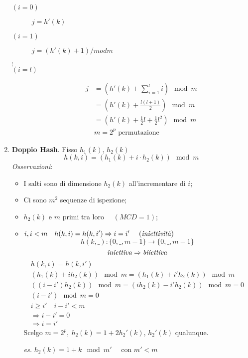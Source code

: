 \begin{enumerate}
    \begin{description}
        \item[$(i=0) \quad$] $j = h'(k)$
        \item[$(i=1) \quad$] $j = (h'(k)+1) /mod m$
        \item[$\vdots$] 
        \item[$(i=l) \quad$] 
        \begin{align*}
            j & = \left( h'(k) + \displaystyle\sum_{i=1}^{l}i \right) \mod m \\
            & = \left( h'(k) + \frac{l(l+1)}{2} \right) \mod m \\
            & = \left( h'(k) + \frac{1}{2}l + \frac{1}{2}l^2 \right) \mod m \\
            & m = 2^p \text{ permutazione}
        \end{align*}
    \end{description}
    \item \textbf{Doppio Hash}. Fisso $h_1(k)$, $h_2(k)$
    $$h(k,i) = (h_1(k) + i \cdot h_2(k)) \mod m$$
    \emph{Osservazioni}:
    \begin{itemize}
        \item I salti sono di dimensione $h_2(k)$ all'incrementare di $i$; 
        \item Ci sono $m^2$ sequenze di ispezione;
        \item $h_2(k)$ e $m$ primi tra loro $ \quad (MCD = 1)$;
        \item $i, i<m \quad h(k,i) = h(k,i') \Rightarrow i = i' \ \quad (\text{\emph{iniettività}})$
        $$h(k, \_) : \{ 0, \_, m-1 \} \rightarrow \{ 0,\_, m-1 \}$$
        $$\text{\emph{iniettiva}} \Rightarrow \text{\emph{biiettiva}}$$
        \begin{gather*}
            h(k,i) = h(k,i') \\
            (h_1(k) + ih_2(k)) \mod m = (h_1(k) + i'h_2(k)) \mod m \\
            ((i - i')h_2(k)) \mod m = (i h_2(k) - i'h_2(k)) \mod m = 0 \\
            (i - i') \mod m = 0 \\
            i \geq i' \quad i - i' < m \\ 
            \Rightarrow i - i' = 0 \\
            \Rightarrow i = i'
        \end{gather*}
        Scelgo $m = 2^p, \ h_2(k) = 1 + 2h_2'(k)$, $h_2'(k)$ qualunque.\par
        \emph{es.} $h_2(k) = 1 + k \mod m' \quad$ con $m' < m$
    \end{itemize}
    \end{enumerate}

